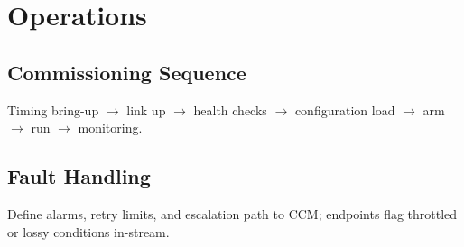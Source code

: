 
\section{Operations}
\subsection{Commissioning Sequence}
Timing bring-up $\to$ link up $\to$ health checks $\to$ configuration load $\to$ arm $\to$ run $\to$ monitoring.
\subsection{Fault Handling}
Define alarms, retry limits, and escalation path to CCM; endpoints flag throttled or lossy conditions in-stream.
